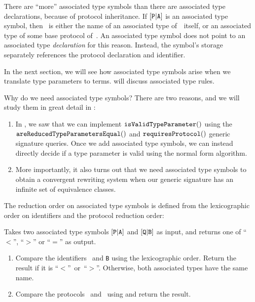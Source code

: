 \documentclass[../generics]{subfiles}
\begin{document}
There are ``more'' associated type symbols than there are associated type declarations, because of protocol inheritance. If $[\texttt{P}|\texttt{A}]$ is an associated type symbol, then \nA\ is either the name of an associated type of~\tP\ itself, or an associated type of some base protocol of~\tP. An associated type symbol does not point to an associated type \emph{declaration} for this reason. Instead, the symbol's storage separately references the protocol declaration and identifier.

In the next section, we will see how associated type symbols arise when we translate type parameters to terms.  will discuss associated type rules.

Why do we need associated type symbols? There are two reasons, and we will study them in great detail in :
\begin{enumerate}
\item In , we saw that we can implement $\texttt{isValidTypeParameter}()$ using the $\texttt{areReducedTypeParametersEqual}()$ and $\texttt{requiresProtocol}()$ generic signature queries. Once we add associated type symbols, we can instead directly decide if a type parameter is valid using the normal form algorithm.

\item More importantly, it also turns out that we need associated type symbols to obtain a convergent rewriting system when our generic signature has an infinite set of equivalence classes.
\end{enumerate}

The reduction order on associated type symbols is defined from the lexicographic order on identifiers and the protocol reduction order:
\begin{algorithm}\label{associated type reduction order} Takes two associated type symbols $[\texttt{P}|\texttt{A}]$ and $[\texttt{Q}|\texttt{B}]$ as input, and returns one of ``$<$'', ``$>$'' or ``$=$'' as output.
\begin{enumerate}
\item Compare the identifiers \nA\ and \texttt{B} using the lexicographic order. Return the result if it is ``$<$''~or~``$>$''. Otherwise, both associated types have the same name.
\item Compare the protocols \tP\ and \tQ\ using  and return the result.
\end{enumerate}
\end{algorithm}
\end{document}
